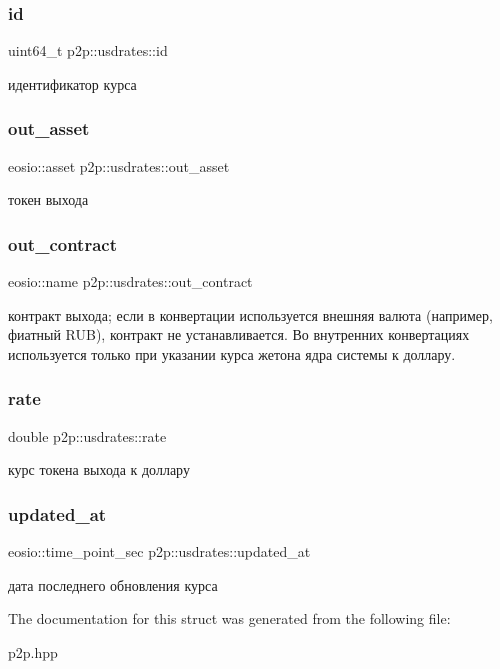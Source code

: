 \subsubsection{\texorpdfstring{id}{id}}
{\footnotesize\ttfamily uint64\+\_\+t p2p\+::usdrates\+::id}

идентификатор курса \mbox{\label{structp2p_1_1usdrates_ac6ba77785a025d183b2378d5b1bb7f69}} 
\subsubsection{\texorpdfstring{out\+\_\+asset}{out\_asset}}
{\footnotesize\ttfamily eosio\+::asset p2p\+::usdrates\+::out\+\_\+asset}

токен выхода \mbox{\label{structp2p_1_1usdrates_a6e1aa8746a552939956d3aa3e93782d9}} 
\subsubsection{\texorpdfstring{out\+\_\+contract}{out\_contract}}
{\footnotesize\ttfamily eosio\+::name p2p\+::usdrates\+::out\+\_\+contract}

контракт выхода; если в конвертации используется внешняя валюта (например, фиатный R\+UB), контракт не устанавливается. Во внутренних конвертациях используется только при указании курса жетона ядра системы к доллару. \mbox{\label{structp2p_1_1usdrates_a4a0439519abb54675759686a1b5fe43a}} 
\subsubsection{\texorpdfstring{rate}{rate}}
{\footnotesize\ttfamily double p2p\+::usdrates\+::rate}

курс токена выхода к доллару \mbox{\label{structp2p_1_1usdrates_a79bb6e9971e40371c8003013887bf294}} 
\subsubsection{\texorpdfstring{updated\+\_\+at}{updated\_at}}
{\footnotesize\ttfamily eosio\+::time\+\_\+point\+\_\+sec p2p\+::usdrates\+::updated\+\_\+at}

дата последнего обновления курса 

The documentation for this struct was generated from the following file\+:\begin{DoxyCompactItemize}
\item 
p2p.\+hpp\end{DoxyCompactItemize}
